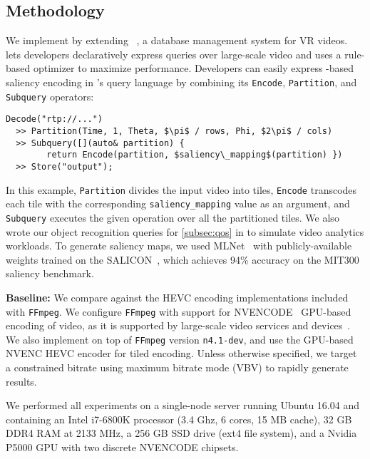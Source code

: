 
\subsection{Methodology}
\label{sec:vignette-methodology}

We implement \name by extending \lightdb~\cite{lightdb}, a database management system for VR videos.
\lightdb{} lets developers declaratively express queries over large-scale video and uses a rule-based optimizer to maximize performance.
Developers can easily express \hevc-based saliency encoding in \lightdb's query language by combining its \texttt{Encode}, \texttt{Partition}, and \texttt{Subquery} operators:
\begin{lstlisting}[style=VRQL]
Decode("rtp://...")
  >> Partition(Time, 1, Theta, $\pi$ / rows, Phi, $2\pi$ / cols)
  >> Subquery([](auto& partition) {
        return Encode(partition, $saliency\_mapping$(partition) })
  >> Store("output");
\end{lstlisting}

\noindent In this example, \texttt{Partition} divides the input video into tiles, \texttt{Encode} transcodes each tile with the corresponding \texttt{saliency\_mapping} value as an argument, and  \texttt{Subquery} executes the given operation over all the partitioned tiles.
We also wrote our object recognition queries for \ref{subsec:qos} in \lightdb to simulate video analytics workloads.
To generate saliency maps, we used MLNet~\cite{mlnet2016} with publicly-available weights trained on the SALICON~\cite{huang2015salicon}, which achieves 94\% accuracy on the MIT300 saliency benchmark.

\noindent\textbf{Baseline: } We compare \name against the HEVC encoding implementations included with \texttt{FFmpeg}.
We configure \texttt{FFmpeg} with support for NVENCODE~\cite{nvenc} GPU-based encoding of \hevc video, as it is supported by large-scale video services and devices~\cite{de2016large}.
We also implement \nameCompress on top of \texttt{FFmpeg} version \texttt{n4.1-dev}, and use the GPU-based NVENC HEVC encoder for tiled encoding.
Unless otherwise specified, we target a constrained bitrate using maximum bitrate mode (VBV) to rapidly generate results.

We performed all experiments on a single-node server running Ubuntu 16.04 and containing an Intel i7-6800K processor (3.4 Ghz, 6 cores, 15 MB cache), 32 GB DDR4 RAM at 2133 MHz, a 256 GB SSD drive (ext4 file system), and a Nvidia P5000 GPU with two discrete NVENCODE chipsets.

